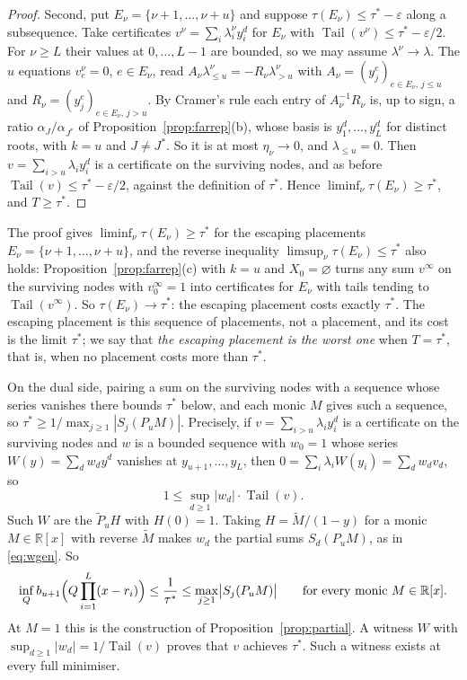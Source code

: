 \documentclass[11pt]{article}
\theoremstyle{definition}
\theoremstyle{plain}
\newcommand{\R}{\mathbb R}
\DeclareMathOperator{\Tail}{Tail}
\begin{document}
\begin{proof}
Second, put $E_\nu=\{\nu+1,\ldots,\nu+u\}$ and suppose
$\tau(E_\nu)\le\tau^*-\varepsilon$ along a subsequence.  Take certificates
$v^\nu=\sum_i\lambda^\nu_iy_i^d$ for $E_\nu$ with
$\Tail(v^\nu)\le\tau^*-\varepsilon/2$.  For $\nu\ge L$ their values at
$0,\ldots,L-1$ are bounded, so we may assume $\lambda^\nu\to\lambda$.  The $u$
equations $v^\nu_e=0$, $e\in E_\nu$, read
$A_\nu\lambda^\nu_{\le u}=-R_\nu\lambda^\nu_{>u}$ with
$A_\nu=(y_j^e)_{e\in E_\nu,\,j\le u}$ and
$R_\nu=(y_j^e)_{e\in E_\nu,\,j>u}$.  By Cramer's rule each entry of
$A_\nu^{-1}R_\nu$ is, up to sign, a ratio $\alpha_J/\alpha_{J^*}$ of
Proposition~\ref{prop:farrep}(b), whose basis is $y_1^d,\ldots,y_L^d$ for
distinct roots, with $k=u$ and $J\ne J^*$.  So it is at most $\eta_\nu\to0$, and $\lambda_{\le u}=0$.  Then
$v=\sum_{i>u}\lambda_iy_i^d$ is a certificate on the surviving nodes, and as
before $\Tail(v)\le\tau^*-\varepsilon/2$, against the definition of $\tau^*$.
Hence $\liminf_\nu\tau(E_\nu)\ge\tau^*$, and $T\ge\tau^*$.
\end{proof}

The proof gives $\liminf_\nu\tau(E_\nu)\ge\tau^*$ for the escaping
placements $E_\nu=\{\nu+1,\ldots,\nu+u\}$, and the reverse inequality
$\limsup_\nu\tau(E_\nu)\le\tau^*$ also holds: Proposition~\ref{prop:farrep}(c)
with $k=u$ and $X_0=\varnothing$ turns any sum $v^\infty$ on the surviving
nodes with $v^\infty_0=1$ into certificates for $E_\nu$ with tails tending
to $\Tail(v^\infty)$.  So $\tau(E_\nu)\to\tau^*$:
the escaping placement costs exactly $\tau^*$.  The escaping placement is
this sequence of placements, not a placement, and its cost is the limit
$\tau^*$; we say that \emph{the escaping placement is the worst one} when
$T=\tau^*$, that is, when no placement costs more than $\tau^*$.

On the dual side, pairing a sum on the surviving nodes with a sequence
whose series vanishes there bounds $\tau^*$ below, and each monic $M$ gives
such a sequence, so $\tau^*\ge1/\max_{j\ge1}|S_j(P_uM)|$.  Precisely, if
$v=\sum_{i>u}\lambda_iy_i^d$ is a certificate on the surviving nodes and $w$
is a bounded sequence with $w_0=1$ whose series $W(y)=\sum_dw_dy^d$ vanishes
at $y_{u+1},\ldots,y_L$, then $0=\sum_i\lambda_iW(y_i)=\sum_dw_dv_d$, so
\begin{equation}\label{eq:dualpair}
  1\le\sup_{d\ge1}|w_d|\cdot\Tail(v).
\end{equation}
Such $W$ are the $\widetilde P_uH$ with $H(0)=1$.  Taking
$H=\widetilde M/(1-y)$ for a monic $M\in\R[x]$ with reverse $\widetilde M$
makes $w_d$ the partial sums $S_d(P_uM)$, as in \eqref{eq:wgen}.  So
\begin{equation}\label{eq:multiplier}
  \inf_Qb_{u+1}\Bigl(Q\prod_{i=1}^L(x-r_i)\Bigr)\le\frac1{\tau^*}
  \le\max_{j\ge1}\bigl|S_j(P_uM)\bigr|
  \qquad\text{for every monic }M\in\R[x].
\end{equation}
At $M=1$ this is the construction of Proposition~\ref{prop:partial}.  A
witness $W$ with $\sup_{d\ge1}|w_d|=1/\Tail(v)$ proves that $v$ achieves
$\tau^*$.  Such a witness exists at every full minimiser.
\end{document}
